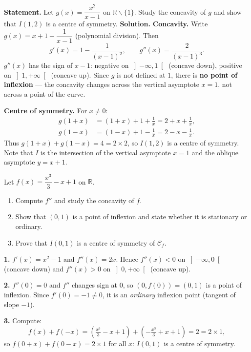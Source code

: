 \documentclass[11pt]{article}
\def\setminus{\mathbin{\backslash}}\let\smallsetminus\setminus
\begin{document}
\begin{exoresolu}
\textbf{Statement.} Let $g(x) = \dfrac{x^2}{x-1}$ on $\mathbb{R}\setminus\{1\}$. Study the concavity of $g$ and show that $I(1,2)$ is a centre of symmetry.
\tcblower
\textbf{Solution.} \textbf{Concavity.} Write $g(x) = x + 1 + \dfrac{1}{x-1}$ (polynomial division). Then
\[ g'(x) = 1 - \frac{1}{(x-1)^2}, \qquad g''(x) = \frac{2}{(x-1)^3}. \]
$g''(x)$ has the sign of $x-1$: negative on $\left]-\infty,1\right[$ (concave down), positive on $\left]1,+\infty\right[$ (concave up). Since $g$ is not defined at $1$, there is \textbf{no point of inflexion} — the concavity changes across the vertical asymptote $x=1$, not across a point of the curve.

\textbf{Centre of symmetry.} For $x \neq 0$:
\begin{align*}
g(1+x) &= (1+x) + 1 + \frac{1}{x} = 2 + x + \frac{1}{x}, \\
g(1-x) &= (1-x) + 1 - \frac{1}{x} = 2 - x - \frac{1}{x}.
\end{align*}
Thus $g(1+x) + g(1-x) = 4 = 2 \times 2$, so $I(1,2)$ is a centre of symmetry. Note that $I$ is the intersection of the vertical asymptote $x=1$ and the oblique asymptote $y = x+1$.
\end{exoresolu}

\begin{exercice}
Let $f(x) = \dfrac{x^3}{3} - x + 1$ on $\mathbb{R}$.
\begin{enumerate}
\item Compute $f''$ and study the concavity of $f$.
\item Show that $(0,1)$ is a point of inflexion and state whether it is stationary or ordinary.
\item Prove that $I(0,1)$ is a centre of symmetry of $\mathcal{C}_f$.
\end{enumerate}
\end{exercice}

\begin{corrige}[Exercise 1]
\textbf{1.} $f'(x) = x^2 - 1$ and $f''(x) = 2x$. Hence $f''(x) < 0$ on $\left]-\infty,0\right[$ (concave down) and $f''(x) > 0$ on $\left]0,+\infty\right[$ (concave up).

\textbf{2.} $f''(0) = 0$ and $f''$ changes sign at $0$, so $(0, f(0)) = (0,1)$ is a point of inflexion. Since $f'(0) = -1 \neq 0$, it is an \emph{ordinary} inflexion point (tangent of slope $-1$).

\textbf{3.} Compute:
\[ f(x) + f(-x) = \left(\tfrac{x^3}{3} - x + 1\right) + \left(-\tfrac{x^3}{3} + x + 1\right) = 2 = 2 \times 1, \]
so $f(0+x) + f(0-x) = 2 \times 1$ for all $x$: $I(0,1)$ is a centre of symmetry.
\end{corrige}
\end{document}
